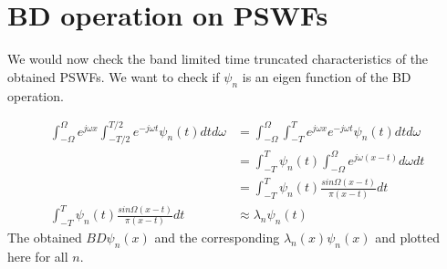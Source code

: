 \documentclass[a4paper,10pt]{article}
\begin{document}
\section{BD operation on PSWFs}
We would now check the band limited time truncated characteristics of the obtained PSWFs. We want to check if $\psi_n$ is an eigen function of the BD  operation.

\begin{align}
\int_{-\Omega}^{\Omega} e^{j\omega  x} \int_{-T/2}^{T/2} e^{-j\omega  t} \psi_n(t) dt d\omega &= \int_{-\Omega}^{\Omega} \int_{-T}^{T} e^{j\omega  x} e^{-j\omega  t} \psi_n(t) dt d\omega \nonumber \\
&= \int_{-T}^{T} \psi_n(t) \int_{-\Omega}^{\Omega} e^{j\omega  (x-t)} d\omega dt \nonumber\\
&= \int_{-T}^{T} \psi_n(t) \frac{sin\Omega(x-t)}{\pi (x-t)} dt \nonumber \\
\int_{-T}^{T} \psi_n(t) \frac{sin\Omega(x-t)}{\pi (x-t)} dt  &\approx \lambda_n \psi_n(t)
\end{align}
The obtained $BD \psi_n(x)$ and the corresponding $\lambda_n(x)\psi_n(x)$ and plotted here for all $n$.
\end{document}
